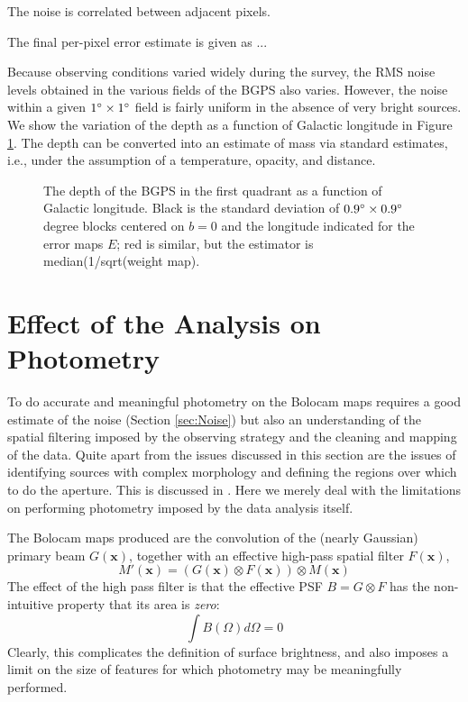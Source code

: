 \documentclass[12pt,preprint]{aastex}
\newcommand{\vect}[1]{\mathbf{#1}}
\newcommand{\xad}{\vect{x}}
\def\Figure#1#2#3#4{
\begin{figure}[htb]
\epsscale{#4}
\plotone{#1}
\caption{#2}
\label{#3}
\end{figure}
}
\begin{document}
The noise is correlated between adjacent pixels.  

The final per-pixel error estimate is given as ...

Because observing conditions varied widely during the survey, the RMS
noise levels obtained in the various fields of the BGPS also varies.
However, the noise within a given $1\mbox{$^\circ$} \times 1\mbox{$^\circ$}$ field is
fairly uniform in the absence of very bright sources.  We show the
variation of the depth as a function of Galactic longitude in Figure
\ref{fig:NoiseVsLongitude}.  The depth can be converted into an
estimate of mass via standard estimates, i.e., under the assumption of
a temperature, opacity, and distance.

\Figure{survey_depth}{The depth of the BGPS in the first quadrant as a
function of Galactic longitude.  Black is the standard deviation of
$0.9\mbox{$^\circ$} \times 0.9\mbox{$^\circ$}$ degree blocks centered on $b=0$ and the
longitude indicated for the error maps $E$; red is similar, but the
estimator is median(1/sqrt(weight map).}{fig:NoiseVsLongitude}{1.0}

\section{Effect of the Analysis on Photometry}
\label{sec:Photometry}

To do accurate and meaningful photometry on the Bolocam maps requires
a good estimate of the noise (Section \ref{sec:Noise}) but also an
understanding of the spatial filtering imposed by the observing
strategy and the cleaning and mapping of the data.  Quite apart from
the issues discussed in this section are the issues of identifying
sources with complex morphology and defining the regions over which to
do the aperture.  This is discussed in \citet{rosolowsky09}.  Here we
merely deal with the limitations on performing photometry imposed by
the data analysis itself.

The Bolocam maps produced are the convolution of the (nearly Gaussian)
primary beam $G(\xad)$, together with an effective high-pass
spatial filter $F(\xad)$,
\[
M'(\xad) = (G(\xad) \otimes F(\xad)) \otimes M(\xad)
\]
The effect of the high pass filter is that the effective PSF $B=G
\otimes F$ has the non-intuitive property that its area is {\em zero}:
\[
\int{B(\Omega) d\Omega} = 0
\]
Clearly, this complicates the definition of surface brightness, and
also imposes a limit on the size of features for which photometry may
be meaningfully performed.
\end{document}
